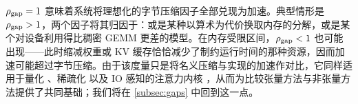\documentclass[11pt]{article}
\begin{document}
$\rho_{\rm gap} = 1$ 意味着系统将理想化的字节压缩因子全部兑现为加速。典型情形是 $\rho_{\rm gap} > 1$，两个因子将其归因于：或是某种以算术为代价换取内存的分解，或是某个对设备利用得比稠密 GEMM 更差的模型。在内存受限区间，$\rho_{\rm gap} < 1$ 也可能出现——此时缩减权重或 KV 缓存恰恰减少了制约运行时间的那种资源，因而加速可能超过字节压缩。由于该度量只是将名义压缩与实现的加速作对比，它同样适用于量化 \cite{frantar2023gptq, dettmers2022llmint8, liu2023llmqat}、稀疏化 \cite{frantar2023sparsegpt, ashkboos2024slicegpt} 以及 IO 感知的注意力内核 \cite{dao2022flashattention}，从而为比较张量方法与非张量方法提供了共同基础；我们将在 \cref{subsec:gaps} 中回到这一点。



\end{document}
